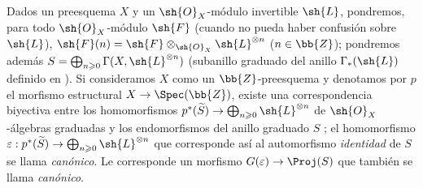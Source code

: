 \documentclass[oneside,10pt]{amsart}
\makeatletter
\renewcommand{\geq}{\geqslant}
\newcommand{\ega@arrow}[2]{\mathchoice{#1}{#2}{#2}{#2}}
\renewcommand{\to}{\ega@arrow{\longrightarrow}{\rightarrow}}
\let\EGAOriginalLabel\label
\renewcommand{\label}[1]{\phantomsection\EGAOriginalLabel{#1}}
\makeatother
\begin{document}
\begin{env}[4.5.1]
\label{II.4.5.1}
Dados un preesquema $X$ y un $\sh{O}_X$-módulo invertible $\sh{L}$, pondremos, para todo $\sh{O}_X$-módulo $\sh{F}$ (cuando no pueda haber confusión sobre $\sh{L}$), $\sh{F}(n)=\sh{F}\otimes_{\sh{O}_X}\sh{L}^{\otimes n}$ ($n\in\bb{Z}$);
pondremos además $S=\bigoplus_{n\geq0}\Gamma(X,\sh{L}^{\otimes n})$ (subanillo graduado del anillo $\Gamma_*(\sh{L})$ definido en ).
Si consideramos $X$ como un $\bb{Z}$-preesquema y denotamos por $p$ el morfismo estructural $X\to\Spec(\bb{Z})$, existe una correspondencia biyectiva entre los homomorfismos $p^*(\widetilde{S})\to\bigoplus_{n\geq0}\sh{L}^{\otimes n}$ de $\sh{O}_X$-álgebras graduadas y los endomorfismos del anillo graduado $S$ ;
el homomorfismo $\varepsilon:p^*(\widetilde{S})\to\bigoplus_{n\geq0}\sh{L}^{\otimes n}$ que corresponde así al automorfismo \emph{identidad} de $S$ se llama \emph{canónico}.
Le corresponde  un morfismo $G(\varepsilon)\to\Proj(S)$ que también se llama \emph{canónico}.
\end{env}
\end{document}
